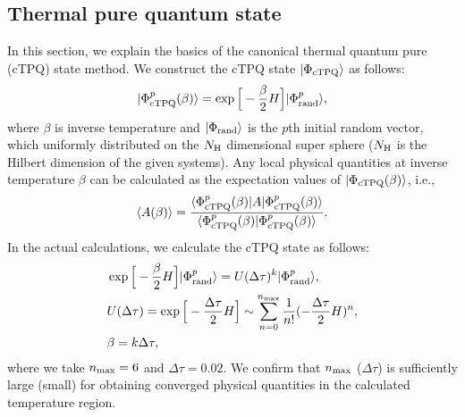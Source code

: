 \documentclass[reprint,amsmath,amssymb,aps,prx]{revtex4-2}
\begin{document}
  \subsection{Thermal pure quantum state}
In this section, we explain the basics of the canonical thermal quantum pure (cTPQ) state method.
We construct the 
cTPQ state $|\Phi_{\rm cTPQ}\rangle$ as follows:
\begin{align}
|\Phi_{\rm cTPQ}^{p}(\beta)\rangle = \exp\Big[-\frac{\beta}{2}H\Big]|\Phi_{\rm rand}^{p}\rangle,
\end{align}
where $\beta$ is inverse temperature and 
$|\Phi_{\rm rand}\rangle$ is the $p$th initial random vector, which uniformly distributed
on the $N_{\rm H}$ dimensional super sphere ($N_{\rm H}$ is the Hilbert dimension of 
the given systems).
Any local physical quantities at inverse temperature $\beta$
can be calculated as the expectation values of $|\Phi_{\rm cTPQ}(\beta)\rangle$, i.e.,
\begin{align}
\langle A(\beta)\rangle
=\frac{\langle \Phi_{\rm cTPQ}^{p}(\beta)|A|\Phi_{\rm cTPQ}^{p}(\beta)\rangle}
{\langle \Phi_{\rm cTPQ}^{p}(\beta)|\Phi_{\rm cTPQ}^{p}(\beta)\rangle}.
\end{align}
In the actual calculations, we calculate the 
cTPQ state as follows:
\begin{align}
&\exp\Big[-\frac{\beta}{2}H\Big]|\Phi_{\rm rand}^{p}\rangle=U(\Delta\tau)^{k}|\Phi_{\rm rand}^{p}\rangle,\\
&U(\Delta\tau)=\exp\Big[-\frac{\Delta\tau}{2}H\Big]\sim\sum_{n=0}^{n_{\rm max}}\frac{1}{n!}(-\frac{\Delta\tau}{2}H)^{n},\\
&\beta=k\Delta\tau,
\end{align}
where we take $n_{\rm max}=6$ and $\Delta\tau =0.02$.
We confirm that $n_{\rm max}$ ($\Delta\tau$) is sufficiently
large (small) for obtaining converged physical quantities 
in the calculated temperature region.
\end{document}
